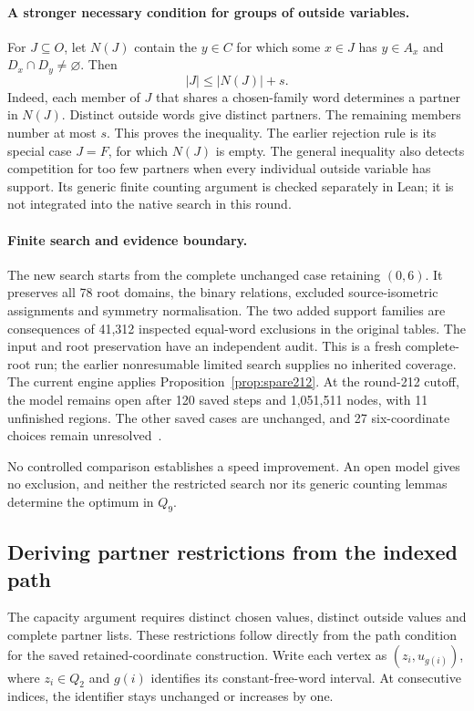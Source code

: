 \documentclass[11pt,a4paper]{article}
\theoremstyle{definition}
\theoremstyle{remark}
\begin{document}
\paragraph{A stronger necessary condition for groups of outside variables.}
For $J\subseteq O$, let $N(J)$ contain the $y\in C$ for which some
$x\in J$ has $y\in A_x$ and $D_x\cap D_y\ne\varnothing$. Then
\begin{equation}\label{eq:partner-capacity212}
|J|\le |N(J)|+s.
\end{equation}
Indeed, each member of $J$ that shares a chosen-family word determines
a partner in $N(J)$. Distinct outside words give distinct partners.
The remaining members number at most $s$. This proves the inequality.
The earlier rejection rule is its special case $J=F$, for which
$N(J)$ is empty. The general inequality also detects competition for
too few partners when every individual outside variable has support.
Its generic finite counting argument is checked separately in Lean;
it is not integrated into the native search in this round.

\paragraph{Finite search and evidence boundary.}
The new search starts from the complete unchanged case retaining
$(0,6)$. It preserves all 78 root domains, the binary relations,
excluded source-isometric assignments and symmetry normalisation.
The two added support families are consequences of 41,312 inspected
equal-word exclusions in the original tables. The input and root
preservation have an independent audit. This is a fresh complete-root
run; the earlier nonresumable limited search supplies no inherited
coverage. The current engine applies Proposition~\ref{prop:spare212}.
At the round-212 cutoff, the model remains open after 120 saved
steps and 1,051,511 nodes, with 11 unfinished regions.
The other saved cases are unchanged, and 27 six-coordinate choices
remain unresolved~\cite{research212}.

No controlled comparison establishes a speed improvement. An open
model gives no exclusion, and neither the restricted search nor its
generic counting lemmas determine the optimum in $Q_9$.


\subsection{Deriving partner restrictions from the indexed path}
\label{sec:interval213}
The capacity argument requires distinct chosen values, distinct outside
values and complete partner lists. These restrictions follow directly
from the path condition for the saved retained-coordinate construction.
Write each vertex as $(z_i,u_{g(i)})$, where $z_i\in Q_2$ and $g(i)$
identifies its constant-free-word interval. At consecutive indices,
the identifier stays unchanged or increases by one.
\end{document}
